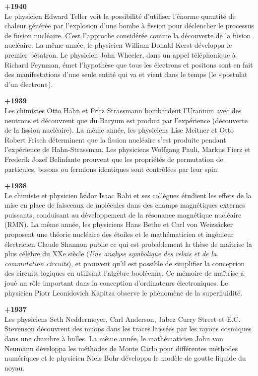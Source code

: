 \textbf{+1940}\\
Le physicien Edward Teller voit la possibilité d'utiliser l'énorme quantité de chaleur générée par l'explosion d'une bombe à fission pour déclencher le processus de fusion nucléaire. C'est l'approche considérée comme la découverte de la fusion nucléaire. La même année, le physicien William Donald Kerst développa le premier bétatron. Le physicien John Wheeler, dans un appel téléphonique à Richard Feynman, émet l'hypothèse que tous les électrons et positons sont en fait des manifestations d'une seule entité qui va et vient dans le temps (le «postulat d'un électron»).

\textbf{+1939}\\
Les chimistes Otto Hahn et Fritz Strassmann bombardent l'Uranium avec des neutrons et découvrent que du Baryum est produit par l'expérience (découverte de la fission nucléaire). La même année, les physiciens Lise Meitner et Otto Robert Frisch déterminent que la fission nucléaire s'est produite pendant l'expérience de Hahn-Strassman. Les physiciens Wolfgang Pauli, Markus Fierz et Frederik Jozef Belinfante prouvent que les propriétés de permutation de particules, bosons ou fermions identiques sont contrôlées par leur spin.

\textbf{+1938}\\
Le chimiste et physicien Isidor Isaac Rabi et ses collègues étudient les effets de la mise en place de faisceaux de molécules dans des champs magnétiques externes puissants, conduisant au développement de la résonance magnétique nucléaire (RMN). La même année, les physiciens Hans Bethe et Carl von Weizsäcker proposent une théorie nucléaire des étoiles et le mathématicien et ingénieur électricien Claude Shannon publie ce qui est probablement la thèse de maîtrise la plus célèbre du XXe siècle (\textit{Une analyse symbolique des relais et de la commutation circuits}), et prouvent qu'il est possible de simplifier la conception des circuits logiques en utilisant l'algèbre booléenne. Ce mémoire de maîtrise a joué un rôle important dans la conception d'ordinateurs électroniques. Le physicien Piotr Leonidovich Kapitza observe le phénomène de la superfluidité.

\textbf{+1937}\\
Les physiciens Seth Neddermeyer, Carl Anderson, Jabez Curry Street et E.C. Stevenson découvrent des muons dans les traces laissées par les rayons cosmiques dans une chambre à bulles. La même année, le mathématicien John von Neumann développa les méthodes de Monte Carlo pour différentes méthodes numériques et le physicien Niels Bohr développa le modèle de goutte liquide du noyau.

